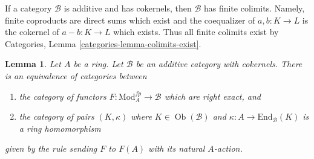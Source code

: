 \documentclass{stacks-project}
\theoremstyle{plain}
\newtheorem{lemma}[subsection]{Lemma}
\theoremstyle{definition}
\theoremstyle{remark}
\numberwithin{equation}{subsection}
\def\Ob{\mathop{\mathrm{Ob}}\nolimits}
\begin{document}
\noindent
If a category $\mathcal{B}$ is additive and has cokernels,
then $\mathcal{B}$ has finite colimits. Namely, finite coproducts
are direct sums which exist and the coequalizer of $a, b : K \to L$
is the cokernel of $a - b : K \to L$ which exists. Thus all finite
colimits exist by Categories, Lemma \ref{categories-lemma-colimits-exist}.

\begin{lemma}
\label{lemma-functor-on-modules-fp}
Let $A$ be a ring. Let $\mathcal{B}$ be an additive category
with cokernels. There is an equivalence of categories between
\begin{enumerate}
\item the category of functors $F : \text{Mod}^{fp}_A \to \mathcal{B}$
which are right exact, and
\item the category of pairs $(K, \kappa)$ where $K \in \Ob(\mathcal{B})$
and $\kappa : A \to \text{End}_\mathcal{B}(K)$ is a ring homomorphism
\end{enumerate}
given by the rule sending $F$ to $F(A)$ with its natural $A$-action.
\end{lemma}
\end{document}
